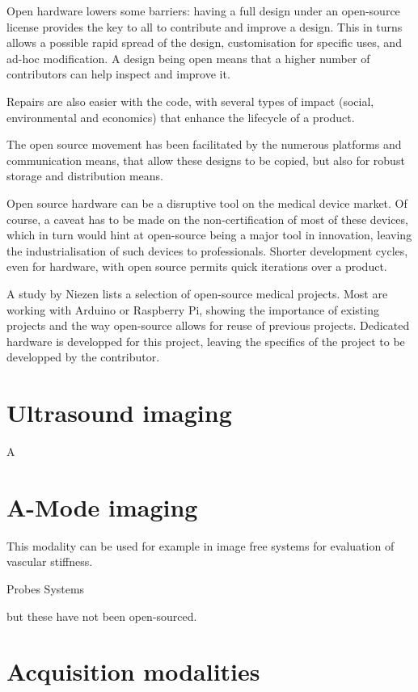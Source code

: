\documentclass[conference]{IEEEtran}
\begin{document}
Open hardware lowers some barriers: having a full design under an open-source license provides the key to all to contribute and improve a design. This in turns allows a possible rapid spread of the design, customisation for specific uses, and ad-hoc modification. A design being open means that a higher number of contributors can help inspect and improve it.

Repairs are also easier with the code, with several types of impact (social, environmental and economics) that enhance the lifecycle of a product.

The open source movement has been facilitated by the numerous platforms and communication means, that allow these designs to be copied, but also for robust storage and distribution means. 


\cite{niezen_open-source_2016}


Open source hardware can be a disruptive tool on the medical device market. Of course, a caveat has to be made on the non-certification of most of these devices, which in turn would hint at open-source being a major tool in innovation, leaving the industrialisation of such devices to professionals. Shorter development cycles, even for hardware, with open source permits quick iterations over a product.


A study by Niezen \cite{niezen_open-source_2016} lists a selection of open-source medical projects. Most are working with Arduino or Raspberry Pi, showing the importance of existing projects and the way open-source allows for reuse of previous projects. Dedicated hardware is developped for this project, leaving the specifics of the project to be developped by the contributor.

\section{Ultrasound imaging}

A

\section{A-Mode imaging}


This modality can be used for example in image free systems for evaluation of vascular stiffness. \cite{joseph_artsenstouch_2015}


Probes \cite{carotenuto_very_2004}
Systems

but these have not been open-sourced.

\section{Acquisition modalities}
\end{document}
